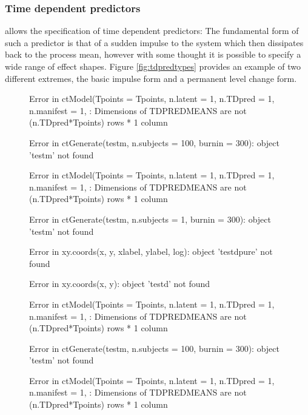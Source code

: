 \documentclass[nojss]{jss}\usepackage[]{graphicx}\usepackage[]{color}
\begin{document}
\subsubsection{Time dependent predictors} \label{sec:tdpreds}\nopagebreak
{} allows the specification of time dependent predictors: The fundamental form of such a predictor is that of a sudden impulse to the system which then dissipates back to the process mean, however with some thought it is possible to specify a wide range of effect shapes. Figure \ref{fig:tdpredtypes} provides an example of two different extremes, the basic impulse form and a permanent level change form.

\begin{figure}[!h]
\begin{Schunk}
\begin{Soutput}
Error in ctModel(Tpoints = Tpoints, n.latent = 1, n.TDpred = 1, n.manifest = 1, : Dimensions of TDPREDMEANS are not (n.TDpred*Tpoints) rows * 1 column
\end{Soutput}
\begin{Soutput}
Error in ctGenerate(testm, n.subjects = 100, burnin = 300): object 'testm' not found
\end{Soutput}
\begin{Soutput}
Error in ctModel(Tpoints = Tpoints, n.latent = 1, n.TDpred = 1, n.manifest = 1, : Dimensions of TDPREDMEANS are not (n.TDpred*Tpoints) rows * 1 column
\end{Soutput}
\begin{Soutput}
Error in ctGenerate(testm, n.subjects = 1, burnin = 300): object 'testm' not found
\end{Soutput}
\begin{Soutput}
Error in xy.coords(x, y, xlabel, ylabel, log): object 'testdpure' not found
\end{Soutput}
\begin{Soutput}
Error in xy.coords(x, y): object 'testd' not found
\end{Soutput}
\begin{Soutput}
Error in ctModel(Tpoints = Tpoints, n.latent = 1, n.TDpred = 1, n.manifest = 1, : Dimensions of TDPREDMEANS are not (n.TDpred*Tpoints) rows * 1 column
\end{Soutput}
\begin{Soutput}
Error in ctGenerate(testm, n.subjects = 100, burnin = 300): object 'testm' not found
\end{Soutput}
\begin{Soutput}
Error in ctModel(Tpoints = Tpoints, n.latent = 1, n.TDpred = 1, n.manifest = 1, : Dimensions of TDPREDMEANS are not (n.TDpred*Tpoints) rows * 1 column

\end{Soutput}
\end{Schunk}
\end{figure}
\end{document}
